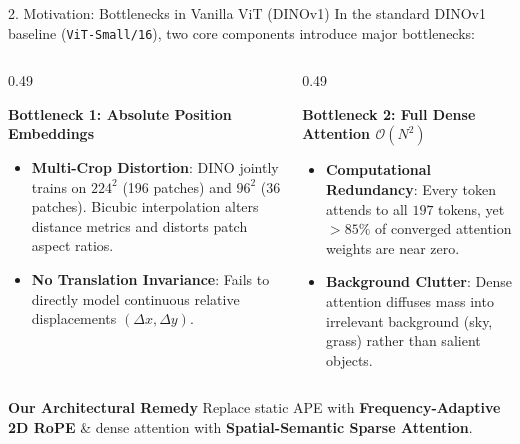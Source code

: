 \documentclass[aspectratio=169,10pt]{beamer}
\begin{document}
\begin{frame}{2. Motivation: Bottlenecks in Vanilla ViT (DINOv1)}
\vspace{-0.4em}
In the standard DINOv1 baseline (\texttt{ViT-Small/16}), two core components introduce major bottlenecks:

\vspace{0.2em}
\begin{columns}[t]
    \begin{column}{0.49\textwidth}
        \begin{alertblock}{\textbf{Bottleneck 1: Absolute Position Embeddings}}
            \small
            \begin{itemize}\setlength{\itemsep}{2pt}
                \item \textbf{Multi-Crop Distortion}: DINO jointly trains on $224^2$ (196 patches) and $96^2$ (36 patches). Bicubic interpolation alters distance metrics and distorts patch aspect ratios.
                \item \textbf{No Translation Invariance}: Fails to directly model continuous relative displacements $(\Delta x, \Delta y)$.
            \end{itemize}
        \end{alertblock}
    \end{column}

    \begin{column}{0.49\textwidth}
        \begin{alertblock}{\textbf{Bottleneck 2: Full Dense Attention $\mathcal{O}(N^2)$}}
            \small
            \begin{itemize}\setlength{\itemsep}{2pt}
                \item \textbf{Computational Redundancy}: Every token attends to all $197$ tokens, yet $>85\%$ of converged attention weights are near zero.
                \item \textbf{Background Clutter}: Dense attention diffuses mass into irrelevant background (sky, grass) rather than salient objects.
            \end{itemize}
        \end{alertblock}
    \end{column}
\end{columns}

\vspace{0.3em}
\begin{exampleblock}{\textbf{Our Architectural Remedy}}
    \centering\small
    Replace static APE with \textbf{Frequency-Adaptive 2D RoPE} \& dense attention with \textbf{Spatial-Semantic Sparse Attention}.
\end{exampleblock}
\end{frame}
\end{document}
